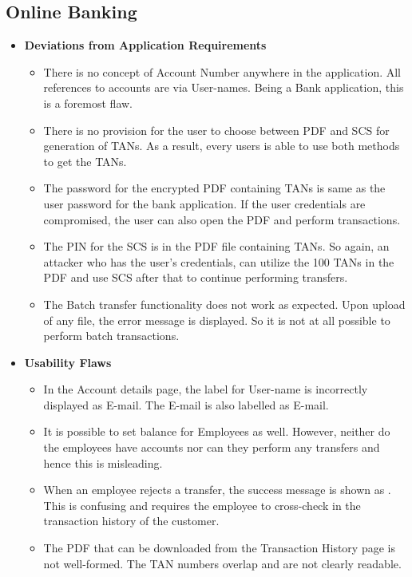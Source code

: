 \subsection{Online Banking}

\begin{itemize}
    \item \textbf{Deviations from Application Requirements}
        \begin{itemize}
            \item There is no concept of Account Number anywhere in the application. All references to accounts are via User-names. Being a Bank application, this is a foremost flaw.
            \item There is no provision for the user to choose between PDF and SCS for generation of TANs. As a result, every users is able to use both methods to get the TANs.
            \item The password for the encrypted PDF containing TANs is same as the user password for the bank application. If the user credentials are compromised, the user can also open the PDF and perform transactions.
            \item The PIN for the SCS is in the PDF file containing TANs. So again, an attacker who has the user’s credentials, can utilize the 100 TANs in the PDF and use SCS after that to continue performing transfers.
            \item The Batch transfer functionality does not work as expected. Upon upload of any file, the error message  is displayed. So it is not at all possible to perform batch transactions.
        \end{itemize}
    \item \textbf{Usability Flaws}
        \begin{itemize}
            \item In the Account details page, the label for User-name is incorrectly displayed as E-mail. The E-mail is also labelled as E-mail.
            \item It is possible to set balance for Employees as well. However, neither do the employees have accounts nor can they perform any transfers and hence this is misleading.
            \item When an employee rejects a transfer, the success message is shown as . This is confusing and requires the employee to cross-check in the transaction history of the customer.
            \item The PDF that can be downloaded from the Transaction History page is not well-formed. The TAN numbers overlap and are not clearly readable.

\end{itemize}
\end{itemize}
